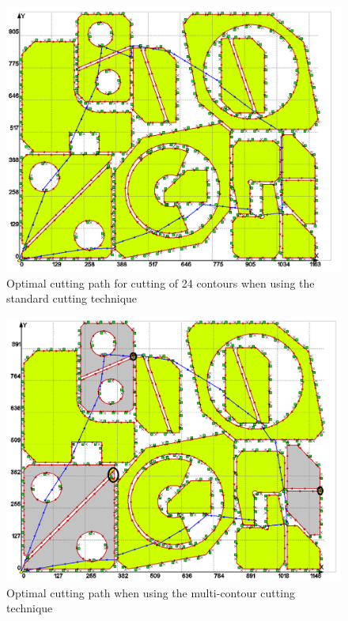 \begin{figure}
  \centering
  \includegraphics[width=120mm]{Fig2-18-24-green.png}
  \caption{Optimal cutting path for cutting of 24 contours when using the standard cutting technique}
  \label{fig:2}
\end{figure}

\begin{figure}
  \centering
  \includegraphics[width=120mm]{Fig3-21.png}
  \caption{Optimal cutting path when using the multi-contour cutting technique}
  \label{fig:3}
\end{figure}

